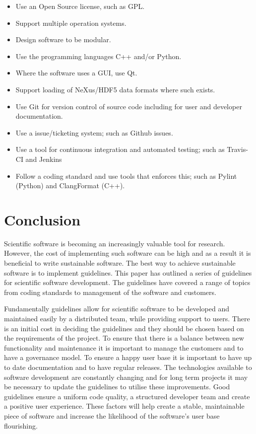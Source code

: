 \documentclass[jnr]{iosart2x}
\begin{document}
\begin{itemzie}
\begin{itemize}
      \item Use an Open Source license, such as GPL.
      \item Support multiple operation systems.
      \item Design software to be modular.
      \item Use the programming languages C++ and/or Python.
      \item Where the software uses a GUI, use Qt.
      \item Support loading of NeXus/HDF5 data formats where such exists.
      \item Use Git for version control of source code including for user and developer documentation.
      \item Use a issue/ticketing system; such as Github issues.
      \item Use a tool for continuous integration and automated testing; such as Travis-CI and Jenkins
      \item Follow a coding standard and use tools that enforces this; such as Pylint (Python) and ClangFormat (C++).
\end{itemize}


\section{Conclusion}
\label{Conclusion}

Scientific software is becoming an increasingly valuable tool for research.
However, the cost of implementing such software can be high and as a result it is beneficial to write sustainable software.
The best way to achieve sustainable software is to implement guidelines.
This paper has outlined a series of guidelines for scientific software development.
The guidelines have covered a range of topics from coding standards to management of the software and customers.

Fundamentally guidelines allow for scientific software to be developed and maintained easily by a distributed team, while providing support to users.
There is an initial cost in deciding the guidelines and they should be chosen based on the requirements of the project.
To ensure that there is a balance between new functionality and maintenance it is important to manage the customers and to have a governance model.
To ensure a happy user base it is important to have up to date documentation and to have regular releases.
The technologies available to software development are constantly changing and for long term projects it may be necessary to update the guidelines to utilise these improvements.
Good guidelines ensure a uniform code quality, a structured developer team and create a positive user experience.
These factors will help create a stable, maintainable piece of software and increase the likelihood of the software's user base flourishing.


\end{itemzie}
\end{document}
